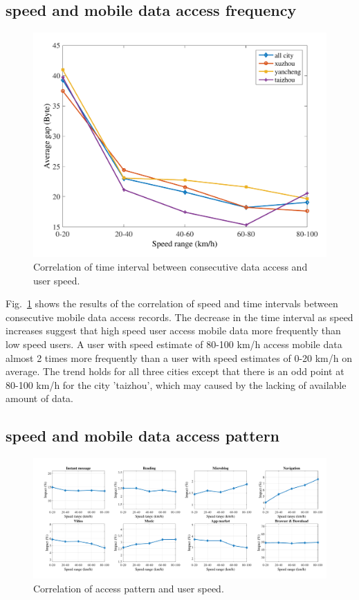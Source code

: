 \subsection{speed and mobile data access frequency}

\begin{figure}[h]
    \centering
    \includegraphics[width=\linewidth]{./figures/speed_gap.pdf}
    \caption{Correlation of time interval between consecutive data access and user speed.}
    \label{fig:speed_gap}
\end{figure}

Fig.~\ref{fig:speed_gap} shows the results of the correlation of speed and time intervals between consecutive mobile data access records. The decrease in the time interval as speed increases suggest that high speed user access mobile data more frequently than low speed users. A user with speed estimate of 80-100 km/h access mobile data almost 2 times more frequently than a user with speed estimates of 0-20 km/h on average. The trend holds for all three cities except that there is an odd point at 80-100 km/h for the city 'taizhou', which may caused by the lacking of available amount of data.

\subsection{speed and mobile data access pattern}

\begin{figure}[ht]
    \centering
    \includegraphics[width=\linewidth]{./figures/speed_appcat.pdf}
    \caption{Correlation of access pattern and user speed.}
    \label{fig:speed_appcat}
\end{figure}

